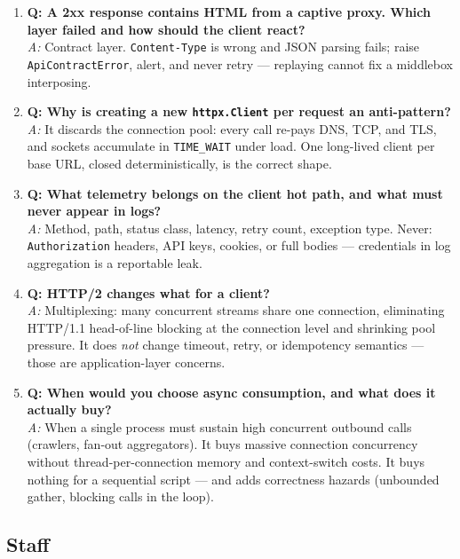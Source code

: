 \begin{enumerate}
  \item \textbf{Q: A 2xx response contains HTML from a captive proxy. Which
        layer failed and how should the client react?}\\
        \textit{A:} Contract layer. \texttt{Content-Type} is wrong and JSON
        parsing fails; raise \texttt{ApiContractError}, alert, and never
        retry --- replaying cannot fix a middlebox interposing.

  \item \textbf{Q: Why is creating a new \texttt{httpx.Client} per request an
        anti-pattern?}\\
        \textit{A:} It discards the connection pool: every call re-pays DNS,
        TCP, and TLS, and sockets accumulate in \texttt{TIME\_WAIT} under
        load. One long-lived client per base URL, closed deterministically,
        is the correct shape.

  \item \textbf{Q: What telemetry belongs on the client hot path, and what
        must never appear in logs?}\\
        \textit{A:} Method, path, status class, latency, retry count,
        exception type. Never: \texttt{Authorization} headers, API keys,
        cookies, or full bodies --- credentials in log aggregation is a
        reportable leak.

  \item \textbf{Q: HTTP/2 changes what for a client?}\\
        \textit{A:} Multiplexing: many concurrent streams share one
        connection, eliminating HTTP/1.1 head-of-line blocking at the
        connection level and shrinking pool pressure. It does \emph{not}
        change timeout, retry, or idempotency semantics --- those are
        application-layer concerns.

  \item \textbf{Q: When would you choose async consumption, and what does it
        actually buy?}\\
        \textit{A:} When a single process must sustain high concurrent
        outbound calls (crawlers, fan-out aggregators). It buys massive
        connection concurrency without thread-per-connection memory and
        context-switch costs. It buys nothing for a sequential script ---
        and adds correctness hazards (unbounded gather, blocking calls in the
        loop).
\end{enumerate}

\subsection{Staff}

